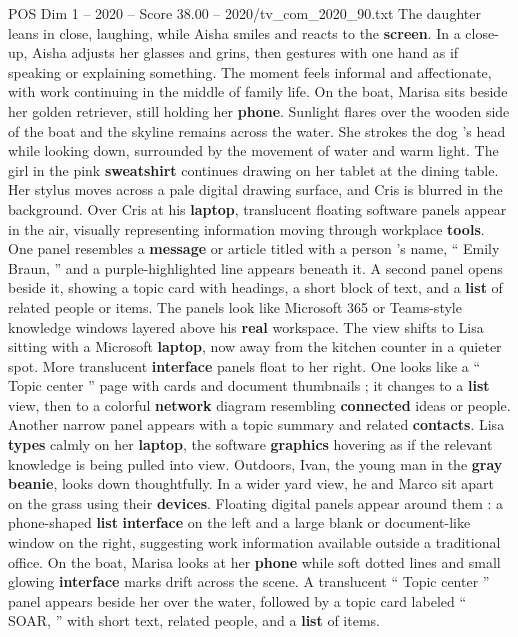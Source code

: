 \begin{textsample}{POS Dim 1 – 2020 – Score 38.00 – 2020/tv\_com\_2020\_90.txt}
The daughter leans in close, laughing, while Aisha smiles and reacts to the \textbf{screen}.
In a close-up, Aisha adjusts her glasses and grins, then gestures with one hand as if speaking or explaining something.
The moment feels informal and affectionate, with work continuing in the middle of family life.
On the boat, Marisa sits beside her golden retriever, still holding her \textbf{phone}.
Sunlight flares over the wooden side of the boat and the skyline remains across the water.
She strokes the dog ’s head while looking down, surrounded by the movement of water and warm light.
The girl in the pink \textbf{sweatshirt} continues drawing on her tablet at the dining table.
Her stylus moves across a pale digital drawing surface, and Cris is blurred in the background.
Over Cris at his \textbf{laptop}, translucent floating software panels appear in the air, visually representing information moving through workplace \textbf{tools}.
One panel resembles a \textbf{message} or article titled with a person ’s name, “ Emily Braun, ” and a purple-highlighted line appears beneath it.
A second panel opens beside it, showing a topic card with headings, a short block of text, and a \textbf{list} of related people or items.
The panels look like Microsoft 365 or Teams-style knowledge windows layered above his \textbf{real} workspace.
The view shifts to Lisa sitting with a Microsoft \textbf{laptop}, now away from the kitchen counter in a quieter spot.
More translucent \textbf{interface} panels float to her right.
One looks like a “ Topic center ” page with cards and document thumbnails ; it changes to a \textbf{list} view, then to a colorful \textbf{network} diagram resembling \textbf{connected} ideas or people.
Another narrow panel appears with a topic summary and related \textbf{contacts}.
Lisa \textbf{types} calmly on her \textbf{laptop}, the software \textbf{graphics} hovering as if the relevant knowledge is being pulled into view.
Outdoors, Ivan, the young man in the \textbf{gray} \textbf{beanie}, looks down thoughtfully.
In a wider yard view, he and Marco sit apart on the grass using their \textbf{devices}.
Floating digital panels appear around them : a phone-shaped \textbf{list} \textbf{interface} on the left and a large blank or document-like window on the right, suggesting work information available outside a traditional office.
On the boat, Marisa looks at her \textbf{phone} while soft dotted lines and small glowing \textbf{interface} marks drift across the scene.
A translucent “ Topic center ” panel appears beside her over the water, followed by a topic card labeled “ SOAR, ” with short text, related people, and a \textbf{list} of items.

\end{textsample}
